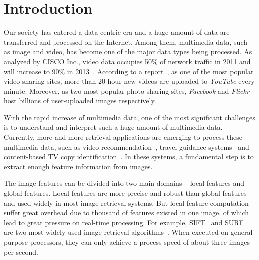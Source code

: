 \section{Introduction}

Our society has entered a data-centric era and a huge amount of data are transferred and processed on the Internet. Among them, multimedia data, such as image and video, has become one of the major data types being processed. As analyzed by CISCO Inc., video data occupies 50\% of network traffic in 2011 and will increase to 90\% in 2013~\cite{CISCO2011}.  According to a report~\cite{youtube2009}, as one of the most popular video sharing sites, more than 20-hour new videos are uploaded to \emph{YouTube} every minute. Moreover, as two most popular photo sharing sites, \emph{Facebook} and \emph{Flickr} host billions of user-uploaded images respectively.

With the rapid increase of multimedia data, one of the most significant challenges is to understand and interpret such a huge amount of multimedia data. Currently, more and more retrieval applications are emerging to process these multimedia data, such as video recommendation~\cite{videorecommendation2007}, travel guidance systems~\cite{travelguidance2010} and content-based TV copy identification~\cite{tvidentify2003}. In these systems, a fundamental step is to extract enough feature information from images. 

The image features can be divided into two main domains -- local features and global features. Local features are more precise and robust than global features and used widely in most image retrieval systems. But local feature computation suffer great overhead due to thousand of features existed in one image.   of which lead to great pressure on real-time processing. For example, SIFT~\cite{Lowe2004SIFT} and SURF~\cite{Bay2006SURF} are two most widely-used image retrieval algorithms~\cite{Mikolajczyk2005Evaluation}\cite{Bauer2007Evaluation}. When executed on general-purpose processors, they can only achieve a process speed of about three images per second.

